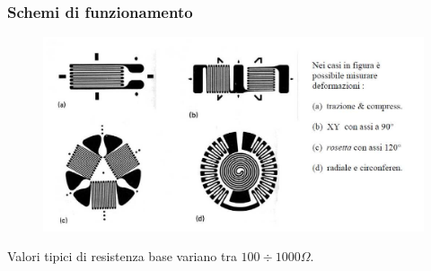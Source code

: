 \documentclass[a4paper, 15pt]{article}
\begin{document}
\subsubsection{Schemi di funzionamento}		
\begin{adjustwidth}{2in}{}	
\begin{figure}[H]
	\centering
	\includegraphics[width=1\linewidth]{immagini/6}
\end{figure}		
		Valori tipici di resistenza base variano tra $100\div1000\Omega$. 
\end{adjustwidth}
\newpage
\end{document}
